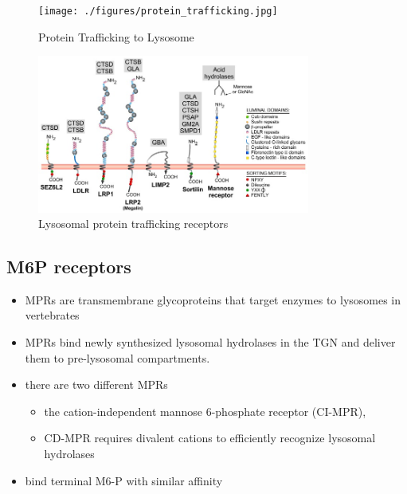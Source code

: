 \documentclass{scrartcl}
\begin{document}
\begin{figure}[htbp]
\centering
\texttt{[image: ./figures/protein\_trafficking.jpg]}
\caption{\label{fig:org32b4ca7}
Protein Trafficking to Lysosome}
\end{figure}

\begin{figure}[htbp]
\centering
\includegraphics[width=0.8\textwidth]{./figures/lysosome_trafficking.jpeg}
\caption[Lysosomal protein trafficking receptors]{\label{fig:org3334645}
Lysosomal protein trafficking receptors}
\end{figure}

\subsection{M6P receptors}
\label{sec:org8bf5b62}
\begin{itemize}
\item MPRs are transmembrane glycoproteins that target enzymes to lysosomes in vertebrates
\item MPRs bind newly synthesized lysosomal hydrolases in the TGN and deliver them to pre-lysosomal compartments.
\item there are two different MPRs
\begin{itemize}
\item the cation-independent mannose 6-phosphate receptor (CI-MPR),
\item CD-MPR requires divalent cations to efficiently recognize lysosomal hydrolases
\end{itemize}
\item bind terminal M6-P with similar affinity
\end{itemize}
\end{document}
